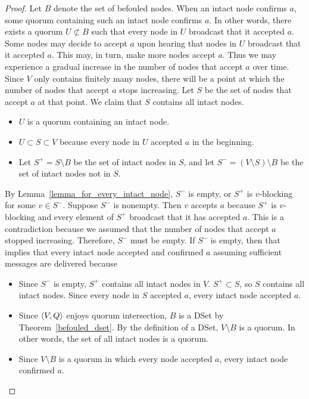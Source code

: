 \documentclass[12pt, psamsfonts]{amsart}
\theoremstyle{definition}
\theoremstyle{remark}
\numberwithin{equation}{subsection}
\begin{document}
\begin{proof}
    Let $B$ denote the set of befouled nodes.
    When an intact node confirms $a$, some quorum containing such an intact node confirms $a$.
    In other words, there exists a quorum $U \not\subset B$ such that every node in $U$ broadcast that it accepted $a$.
    Some nodes may decide to accept $a$ upon hearing that nodes in $U$ broadcast that it accepted $a$.
    This may, in turn, make more nodes accept $a$.
    Thus we may experience a gradual increase in the number of nodes that accept $a$ over time.
    Since $V$ only contains finitely many nodes, there will be a point at which the number of nodes that accept $a$ stops increasing.
    Let $S$ be the set of nodes that accept $a$ at that point.
    We claim that $S$ contains all intact nodes.

    \begin{itemize}
        \item
            $U$ is a quorum containing an intact node.
        \item
            $U \subset S \subset V$ because every node in $U$ accepted $a$ in the beginning.
        \item
            Let $S^{+} = S \setminus B$ be the set of intact nodes in $S$, and let $S^{-} = (V \setminus S) \setminus B$ be the set of intact nodes not in $S$.
    \end{itemize}
    By Lemma~\ref{lemma_for_every_intact_node}, $S^{-}$ is empty, or $S^{+}$ is $v$-blocking for some $v \in S^{-}$.
    Suppose $S^{-}$ is nonempty.
    Then $v$ accepts $a$ because $S^{+}$ is $v$-blocking and every element of $S^{+}$ broadcast that it has accepted $a$.
    This is a contradiction because we assumed that the number of nodes that accept $a$ stopped increasing.
    Therefore, $S^{-}$ must be empty.
    If $S^{-}$ is empty, then that implies that every intact node accepted and confirmed $a$ assuming sufficient messages are delivered because

    \begin{itemize}
        \item
            Since $S^{-}$ is empty, $S^{+}$ contains all intact nodes in $V$.
            $S^{+} \subset S$, so $S$ contains all intact nodes.
            Since every node in $S$ accepted $a$, every intact node accepted $a$.
        \item
            Since $\ev{V, Q}$ enjoys quorum intersection, $B$ is a DSet by Theorem~\ref{befouled_dset}.
            By the definition of a DSet, $V \setminus B$ is a quorum.
            In other words, the set of all intact nodes is a quorum.
        \item
            Since $V \setminus B$ is a quorum in which every node accepted $a$, every intact node confirmed $a$.
    \end{itemize}
\end{proof}
\end{document}
